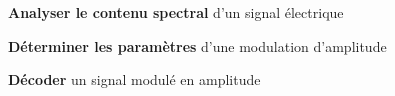 \item \textbf{Analyser le contenu spectral} d'un signal électrique
\item \textbf{Déterminer les paramètres} d'une modulation d'amplitude
\item \textbf{Décoder} un signal modulé en amplitude